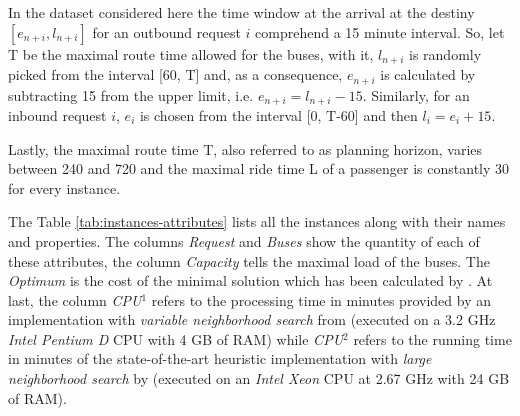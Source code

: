 \documentclass[tuberlin,cic,tc,openright,english,noabntcite,oneside]{iiufrgs}
\begin{document}
In the dataset considered here the time window at the arrival at the destiny $[e_{n+i}, l_{n+i}]$ for an outbound request $i$ comprehend a 15 minute interval. So, let T be the maximal route time allowed for the buses, with it, $l_{n+i}$ is randomly picked from the interval [60, T] and, as a consequence, $e_{n+i}$ is calculated by subtracting 15 from the upper limit, i.e. $e_{n+i} = l_{n+i} - 15$. Similarly, for an inbound request $i$, $e_i$ is chosen from the interval [0, T-60] and then $l_i = e_i + 15$.

Lastly, the maximal route time T, also referred to as planning horizon, varies between 240 and 720 and the maximal ride time L of a passenger is constantly 30 for every instance.

The Table \ref{tab:instances-attributes} lists all the instances along with their names and properties. The columns \emph{Request} and \emph{Buses} show the quantity of each of these attributes, the column \emph{Capacity} tells the maximal load of the buses. The \emph{Optimum} is the cost of the minimal solution which has been calculated by \textcite[p. 270]{ropke_models_2007}. At last, the column \emph{CPU$^1$} refers to the processing time in minutes provided by an implementation with \emph{variable neighborhood search} from \textcite{parragh_introducing_2011} (executed on a 3.2 GHz \emph{Intel Pentium D} CPU with 4 GB of RAM) while \emph{CPU$^2$} refers to the running time in minutes of the state-of-the-art heuristic implementation with \emph{large neighborhood search} by \textcite{parragh_hybrid_2013} (executed on an \emph{Intel Xeon} CPU at 2.67 GHz with 24 GB of RAM).
\end{document}
